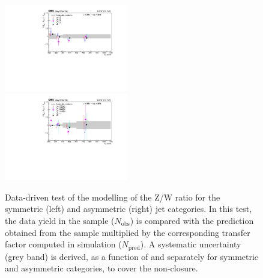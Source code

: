 \begin{figure}[tbhp]
    \caption{ 
  Data-driven test of the modelling of the Z/W ratio for the symmetric (left) and asymmetric (right) jet categories. 
  In this test, the data yield in the \mmj sample ($N_{\mathrm{obs}}$) 
  is compared with the prediction obtained from the \mj sample multiplied by the corresponding 
  transfer factor computed in simulation ($N_{\mathrm{pred}}$). 
  A systematic uncertainty (grey band) is derived, as a function of \scalht and separately for symmetric and asymmetric categories, 
  to cover the non-closure. 
    \label{fig:CT-alphaT} }
  \begin{center}
     \includegraphics[width=0.48\textwidth]{figures/mu_mumusym_half_noFit} ~~
     \includegraphics[width=0.48\textwidth]{figures/mu_mumuasym_half_noFit}
  \end{center}
\end{figure}





